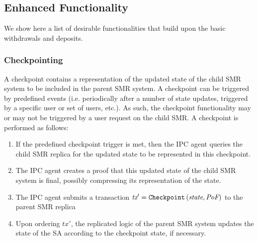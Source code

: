\subsection{Enhanced Functionality}
We show here a list of desirable functionalities that build upon the basic withdrawals and deposits.
\subsubsection{Checkpointing} A checkpoint contains a representation of the updated state of the child SMR system to be included in the parent SMR system. A checkpoint can be triggered by predefined events (i.e. periodically after a number of state updates, triggered by a specific user or set of users, etc.). As such, the checkpoint functionality may or may not be triggered by a user request on the child SMR. A checkpoint is performed as follows: 
\begin{enumerate}
\item If the predefined checkpoint trigger is met, then the IPC agent queries the child SMR replica for the updated state to be represented in this checkpoint.
\item The IPC agent creates a proof \prf that this updated state of the child SMR system is final, possibly compressing its representation of the state.
\item The IPC agent submits a transaction $\textit{tx}'=\texttt{Checkpoint}\left(\textit{state}, \textit{PoF} \right)$ to the parent SMR replica
 \item Upon ordering $tx'$, the replicated logic of the parent SMR system updates the state of the SA according to the checkpoint state, if necessary.
\end{enumerate}

